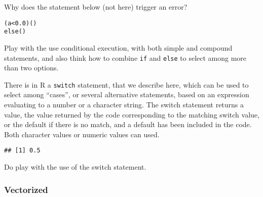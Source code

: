 \documentclass[paper=a4,10pt,div=17,headsepline,BCOR=12mm,twoside,open=right]{scrbook}\usepackage{knitr}
\begin{document}
Why does the statement below (not here) trigger an error?

\begin{knitrout}\footnotesize
{}\color{fgcolor}\begin{kframe}
\begin{alltt}
 (a < 0.0) ()
else ()
\end{alltt}
\end{kframe}
\end{knitrout}

Play with the use conditional execution, with both simple and compound statements, and also think how to combine \texttt{if} and \texttt{else} to select among more than two options.

There is in R a \texttt{switch} statement, that we describe here, which can be used to select among ``cases'', or several alternative statements, based on an expression evaluating to a number or a character string. The switch statement returns a value, the value returned by the code corresponding to the matching switch value, or the default if there is no match, and a default has been included in the code. Both character values or numeric values can used.

\begin{knitrout}\footnotesize
{}\color{fgcolor}\begin{kframe}
\begin{alltt}
 \hlkwb{<-} 
 \hlkwb{<-} 
             \hlstd{=} \hlstd{,}
             \hlstd{=}  \hlopt{/} \hlstd{,}
             \hlstd{=} \hlopt{/} \hlstd{,}
\hlstd{)}
\end{alltt}
\begin{verbatim}
## [1] 0.5
\end{verbatim}
\end{kframe}
\end{knitrout}

Do play with the use of the switch statement.

\subsubsection{Vectorized}
\end{document}
